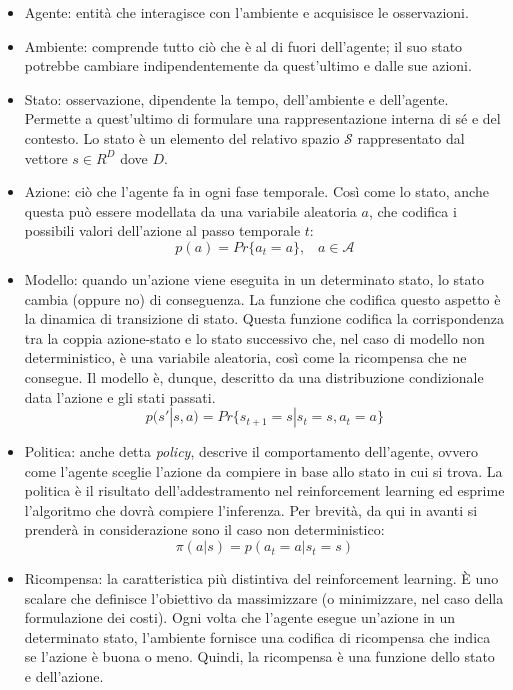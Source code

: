 \begin{itemize} 
    \item Agente: entità che interagisce con l'ambiente e acquisisce le osservazioni.
    \item Ambiente: comprende tutto ciò che è al di fuori dell'agente; il suo stato potrebbe cambiare indipendentemente da quest'ultimo e dalle sue azioni.
    \item Stato: osservazione, dipendente la tempo, dell'ambiente e dell'agente. Permette a quest'ultimo di formulare una rappresentazione interna di sé e del contesto. Lo stato è un elemento del relativo spazio $\mathcal{S}$ rappresentato dal vettore $s \in R^D$ dove $D$.
    \item Azione: ciò che l'agente fa in ogni fase temporale. Così come lo stato, anche questa può essere modellata da una variabile aleatoria $a$, che codifica i possibili valori dell'azione al passo temporale $t$:
        \begin{equation}
            p(a)=Pr\{a_t=a\},\;\;\;a \in \mathcal{A}
        \end{equation}
    \item Modello: quando un'azione viene eseguita in un determinato stato, lo stato cambia (oppure no) di conseguenza. La funzione che codifica questo aspetto è la dinamica di transizione di stato. Questa funzione codifica la corrispondenza tra la coppia azione-stato e lo stato successivo che, nel caso di modello non deterministico, è una variabile aleatoria, così come la ricompensa che ne consegue. Il modello è, dunque, descritto da una distribuzione condizionale data l'azione e gli stati passati.
    \begin{equation}p(s'|s,a)=Pr\{s_{t+1}=s|s_t=s,a_t=a\}\end{equation}
    \item Politica: anche detta \textit{policy}, descrive il comportamento dell'agente, ovvero come l'agente sceglie l'azione da compiere in base allo stato in cui si trova. La politica è il risultato dell'addestramento nel reinforcement learning ed esprime l'algoritmo che dovrà compiere l'inferenza. Per brevità, da qui in avanti si prenderà in considerazione sono il caso non deterministico:
    \begin{equation}\pi(a|s)=p(a_t=a|s_t=s)\end{equation}
    \item Ricompensa: la caratteristica più distintiva del reinforcement learning. È uno scalare che definisce l'obiettivo da massimizzare (o minimizzare, nel caso della formulazione dei costi). Ogni volta che l'agente esegue un'azione in un determinato stato, l'ambiente fornisce una codifica di ricompensa che indica se l'azione è buona o meno. Quindi, la ricompensa è una funzione dello stato e dell'azione.

\end{itemize}
